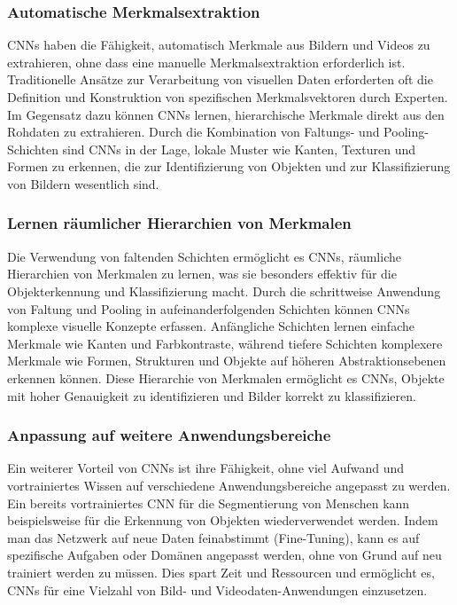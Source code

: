 \subsubsection{Automatische Merkmalsextraktion}

    \acfp{CNN} haben die Fähigkeit, automatisch Merkmale aus Bildern und Videos zu extrahieren, ohne dass eine manuelle Merkmalsextraktion erforderlich ist. 
    Traditionelle Ansätze zur Verarbeitung von visuellen Daten erforderten oft die Definition und Konstruktion von spezifischen Merkmalsvektoren durch Experten. 
    Im Gegensatz dazu können \acp{CNN} lernen, hierarchische Merkmale direkt aus den Rohdaten zu extrahieren. 
    Durch die Kombination von Faltungs- und Pooling-Schichten sind \acp{CNN} in der Lage, lokale Muster wie Kanten, Texturen und Formen zu erkennen, die zur Identifizierung von Objekten und zur Klassifizierung von Bildern wesentlich sind.

\subsubsection{Lernen räumlicher Hierarchien von Merkmalen}

    Die Verwendung von faltenden Schichten ermöglicht es \acp{CNN}, räumliche Hierarchien von Merkmalen zu lernen, was sie besonders effektiv für die Objekterkennung und Klassifizierung macht. 
    Durch die schrittweise Anwendung von Faltung und Pooling in aufeinanderfolgenden Schichten können \acp{CNN} komplexe visuelle Konzepte erfassen. 
    Anfängliche Schichten lernen einfache Merkmale wie Kanten und Farbkontraste, während tiefere Schichten komplexere Merkmale wie Formen, Strukturen und Objekte auf höheren Abstraktionsebenen erkennen können. 
    Diese Hierarchie von Merkmalen ermöglicht es \acp{CNN}, Objekte mit hoher Genauigkeit zu identifizieren und Bilder korrekt zu klassifizieren.

\subsubsection{Anpassung auf weitere Anwendungsbereiche}

    Ein weiterer Vorteil von \acp{CNN} ist ihre Fähigkeit, ohne viel Aufwand und vortrainiertes Wissen auf verschiedene Anwendungsbereiche angepasst zu werden. 
    Ein bereits vortrainiertes \ac{CNN} für die Segmentierung von Menschen kann beispielsweise für die Erkennung von Objekten wiederverwendet werden. 
    Indem man das Netzwerk auf neue Daten feinabstimmt (Fine-Tuning), kann es auf spezifische Aufgaben oder Domänen angepasst werden, ohne von Grund auf neu trainiert werden zu müssen.
    Dies spart Zeit und Ressourcen und ermöglicht es, \acp{CNN} für eine Vielzahl von Bild- und Videodaten-Anwendungen einzusetzen.


